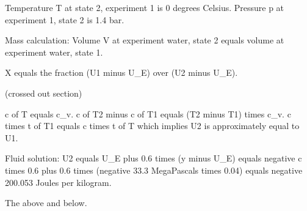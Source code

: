 Temperature T at state 2, experiment 1 is 0 degrees Celsius.
Pressure p at experiment 1, state 2 is 1.4 bar.

Mass calculation:
Volume V at experiment water, state 2 equals volume at experiment water, state 1.

X equals the fraction (U1 minus U_E) over (U2 minus U_E).

(crossed out section)

c of T equals c_v.
c of T2 minus c of T1 equals (T2 minus T1) times c_v.
c times t of T1 equals c times t of T which implies U2 is approximately equal to U1.

Fluid solution:
U2 equals U_E plus 0.6 times (y minus U_E) equals negative c times 0.6 plus 0.6 times (negative 33.3 MegaPascals times 0.04) equals negative 200.053 Joules per kilogram.

The above and below.